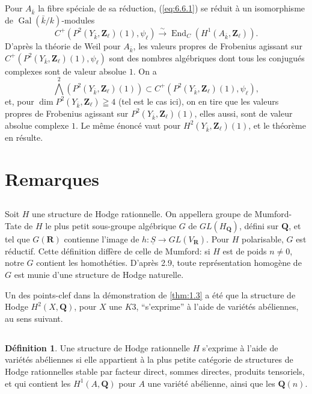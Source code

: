 \documentclass[11pt]{amsart}
\theoremstyle{plain}
\theoremstyle{definition}
\newtheorem{definition}[theoreme]{D\'efinition}
\theoremstyle{remark}
\begin{document}
Pour $A_{\bar{k}}$ la fibre sp\'eciale de sa r\'eduction, (\ref{eq:6.6.1}) se r\'eduit \`a un isomorphisme de $\operatorname{Gal}(\bar{k}/k)$-modules
\begin{equation}\label{eq:6.6.2}
C^+(P^2(Y_{\bar{k}},\mathbf{Z}_\ell)(1),\psi_\ell)\xrightarrow{\sim}\operatorname{End}_C(H^1(A_{\bar{k}},\mathbf{Z}_\ell)).
\end{equation}
D'apr\`es la th\'eorie de Weil pour $A_{\bar{k}}$, les valeurs propres de Frobenius agissant sur $C^+(P^2(Y_{\bar{k}},\mathbf{Z}_\ell)(1),\psi_\ell)$ sont des nombres alg\'ebriques dont tous les conjugu\'es complexes sont de valeur absolue $1$. On a
\begin{equation*}
\overset{2}{\bigwedge}(P^2(Y_{\bar{k}},\mathbf{Z}_\ell)(1))\subset C^+(P^2(Y_{\bar{k}},\mathbf{Z}_\ell)(1),\psi_\ell),
\end{equation*}
et, pour $\dim P^2(Y_{\bar{k}},\mathbf{Z}_\ell)\geqq 4$ (tel est le cas ici), on en tire que les valeurs propres de Frobenius agissant sur $P^2(Y_{\bar{k}},\mathbf{Z}_\ell)(1)$, elles aussi, sont de valeur absolue complexe $1$. Le m\^eme \'enonc\'e vaut pour $H^2(Y_{\bar{k}},\mathbf{Z}_\ell)(1)$, et le th\'eor\`eme en r\'esulte.

\section{Remarques}

\subsection*{}
Soit $H$ une structure de Hodge rationnelle. On appellera groupe de Mumford-Tate de $H$ le plus petit sous-groupe alg\'ebrique $G$ de $GL(H_\mathbf{Q})$, d\'efini sur $\mathbf{Q}$, et tel que $G(\mathbf{R})$ contienne l'image de $h\colon\underline{S}\to GL(V_\mathbf{R})$. Pour $H$ polarisable, $G$ est r\'eductif. Cette d\'efinition diff\`ere de celle de Mumford: si $H$ est de poids $n\neq0$, notre $G$ contient les homoth\'eties. D'apr\`es 2.9, toute repr\'esentation homog\`ene de $G$ est munie d'une structure de Hodge naturelle.

Un des points-clef dans la d\'emonstration de \ref{thm:1.3} a \'et\'e que la structure de Hodge $H^2(X,\mathbf{Q})$, pour $X$ une $K3$, ``s'exprime'' \`a l'aide de vari\'et\'es ab\'eliennes, au sens suivant.

\subsection*{}
\begin{definition}
Une structure de Hodge rationnelle $H$ s'exprime \`a l'aide de vari\'et\'es ab\'eliennes si elle appartient \`a la plus petite cat\'egorie de structures de Hodge rationnelles stable par facteur direct, sommes directes, produits tensoriels, et qui contient les $H^1(A,\mathbf{Q})$ pour $A$ une vari\'et\'e ab\'elienne, ainsi que les $\mathbf{Q}(n)$.
\end{definition}
\end{document}
